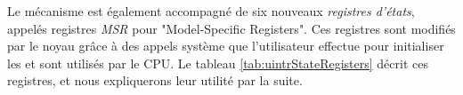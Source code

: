 \begin{table}[H]
  \centering
  \caption{Instructions des interruptions et des interruptions en espace utilisateur}
  \label{tab:interruptInstructions}
\end{table}

Le mécanisme est également accompagné de six nouveaux \emph{registres d'états}, appelés registres \emph{MSR} pour "Model-Specific Registers".
Ces registres sont modifiés par le noyau grâce à des appels système que l'utilisateur effectue pour initialiser les \uintr{} et sont utilisés par le CPU.
Le tableau \ref{tab:uintrStateRegisters} décrit ces registres, et nous expliquerons leur utilité par la suite.

